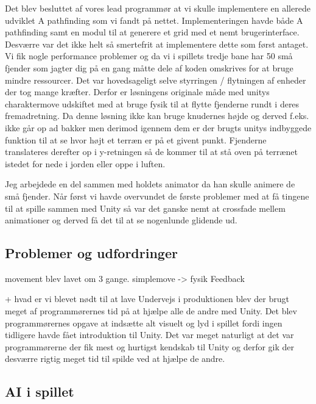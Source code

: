 Det blev besluttet af vores lead programmør at vi skulle implementere
en allerede udviklet A\* pathfinding som vi fandt på
nettet. Implementeringen havde både A\* pathfinding samt en modul til
at generere et grid med et nemt brugerinterface. Desværre var det ikke
helt så smertefrit at implementere dette som først antaget. Vi fik
nogle performance problemer og da vi i spillets tredje bane har 50 små
fjender som jagter dig på en gang måtte dele af koden omskrives for at
bruge mindre ressourcer. Det var hovedsageligt selve styrringen /
flytningen af enheder der tog mange kræfter. Derfor er løsningens
originale måde med unitys charaktermove udskiftet med at bruge fysik
til at flytte fjenderne rundt i deres fremadretning. Da denne løsning
ikke kan bruge knudernes højde og derved f.eks. ikke går op ad bakker
men derimod igennem dem er der brugts unitys indbyggede funktion til
at se hvor højt et terræn er på et givent punkt. Fjenderne
translateres derefter op i y-retningen så de kommer til at stå oven på
terrænet istedet for nede i jorden eller oppe i luften.

Jeg arbejdede en del sammen med holdets animator da han skulle animere
de små fjender. Når først vi havde overvundet de første problemer med
at få tingene til at spille sammen med Unity så var det ganske nemt at
crossfade mellem animationer og derved få det til at se nogenlunde
glidende ud.

\subsection{Problemer og udfordringer}



movement blev lavet om 3 gange.  simplemove -> fysik Feedback

                + hvad er vi blevet nødt til at lave Undervejs i
produktionen blev der brugt meget af programmørernes tid på at hjælpe
alle de andre med Unity. Det blev programmørernes opgave at indsætte
alt visuelt og lyd i spillet fordi ingen tidligere havde fået
introduktion til Unity. Det var meget naturligt at det var
programmørerne der fik mest og hurtigst kendskab til Unity og derfor
gik der desværre rigtig meget tid til spilde ved at hjælpe de andre.

\subsection{AI i spillet}


